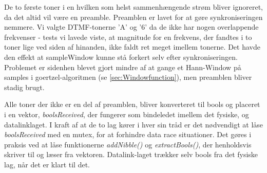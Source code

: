 De to første toner i en hvilken som helst sammenhængende strøm bliver ignoreret, da det altid vil være en preamble. Preamblen er lavet for at gøre synkroniseringen nemmere. Vi valgte DTMF-tonerne 'A' og '6' da de ikke har nogen overlappende frekvenser - tests vi lavede viste, at magnitude for en frekvens, der fandtes i to toner lige ved siden af hinanden, ikke faldt ret meget imellem tonerne. Det havde den effekt at sampleWindow kunne stå forkert selv efter synkroniseringen. Problemet er sidenhen blevet gjort mindre af at gange et Hann-Window på samples i goertzel-algoritmen (se \ref{sec:Windowfunction}), men preamblen bliver stadig brugt. 


Alle toner der ikke er en del af preamblen, bliver konverteret til bools og placeret i en vektor, \textit{boolsReceived}, der fungerer som bindeledet imellem det fysiske, og datalinklaget. I kraft af at de to lag kører i hver sin tråd er det nødvendigt at låse \textit{boolsReceived} med en mutex, for at forhindre data race situationer. Det gøres i praksis ved at låse funktionerne \textit{addNibble()} og \textit{extractBools()}, der henholdsvis skriver til og læser fra vektoren. Datalink-laget trækker selv bools fra det fysiske lag, når det er klart til det.\\

